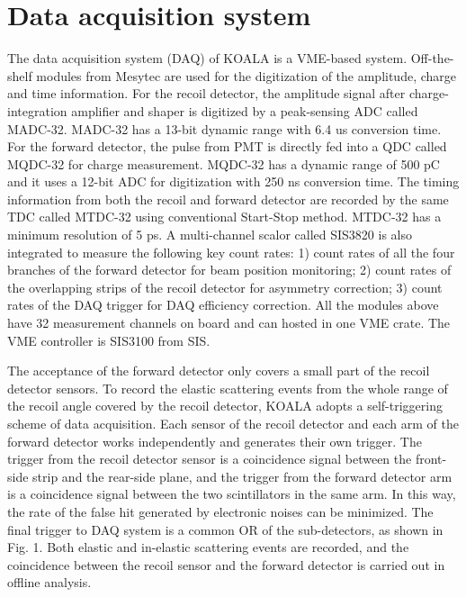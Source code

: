 \documentclass[11pt]{article}
\author{Yong Zhou}
\date{\today}
\title{}
\begin{document}
\tableofcontents


\section{Data acquisition system}
\label{sec:orga37cb93}

The data acquisition system (DAQ) of KOALA is a VME-based system.
Off-the-shelf modules from Mesytec are used for the digitization of the amplitude, charge and time information.
For the recoil detector, the amplitude signal after charge-integration amplifier and shaper is digitized by a peak-sensing ADC called MADC-32.
MADC-32 has a 13-bit dynamic range with 6.4 us conversion time.
For the forward detector, the pulse from PMT is directly fed into a QDC called MQDC-32 for charge measurement.
MQDC-32 has a dynamic range of 500 pC and it uses a 12-bit ADC for digitization with 250 ns conversion time.
The timing information from both the recoil and forward detector are recorded by the same TDC called MTDC-32 using conventional Start-Stop method.
MTDC-32 has a minimum resolution of 5 ps.
A multi-channel scalor called SIS3820 is also integrated to measure the following key count rates: 1) count rates of all the four branches of the forward detector for 
beam position monitoring; 2) count rates of the overlapping strips of the recoil detector for asymmetry correction; 3) count rates of the DAQ trigger 
for DAQ efficiency correction.
All the modules above have 32 measurement channels on board and can hosted in one VME crate.
The VME controller is SIS3100 from SIS.

The acceptance of the forward detector only covers a small part of the recoil detector sensors.
To record the elastic scattering events from the whole range of the recoil angle covered by the recoil detector, KOALA adopts a self-triggering scheme of data acquisition.
Each sensor of the recoil detector and each arm of the forward detector works independently and generates their own trigger. 
The trigger from the recoil detector sensor is a coincidence signal between the front-side strip and the rear-side plane, 
and the trigger from the forward detector arm is a coincidence signal between the two scintillators in the same arm.
In this way, the rate of the false hit generated by electronic noises can be minimized.
The final trigger to DAQ system is a common OR of the sub-detectors, as shown in Fig. 1.
Both elastic and in-elastic scattering events are recorded, and the coincidence between the recoil sensor and the forward detector is carried out in offline analysis.
\end{document}
